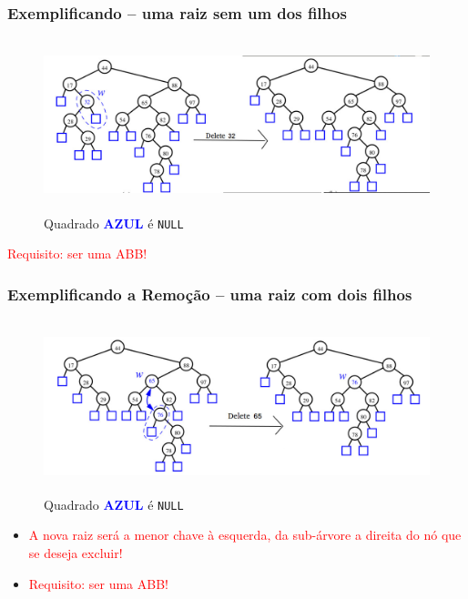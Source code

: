\begin{frame}
\frametitle{Exemplificando -- uma raiz sem um dos filhos}

   \begin{figure}[!ht]
    \centering
    \includegraphics[keepaspectratio=true,width=12cm,height=5cm]{figs/fig_arvores/ex01_Delete_NODE.jpg}
\caption{Quadrado \textbf{\textcolor{blue}{AZUL}} é \texttt{NULL}}
    \end{figure}

\begin{flushleft}
\textcolor{red}{Requisito: ser uma ABB!}
\end{flushleft}
\end{frame}
\begin{frame}
\frametitle{Exemplificando a Remoção -- uma raiz com dois filhos}

   \begin{figure}[!ht]
    \centering
    \includegraphics[keepaspectratio=true,width=12cm,height=5cm]{figs/fig_arvores/ex02_Delete_NODE.jpg}
   \caption{Quadrado \textbf{\textcolor{blue}{AZUL}} é \texttt{NULL}}
    \end{figure}



\begin{flushleft}
\begin{itemize}
  \item \textcolor{red}{A nova raiz será a menor chave à esquerda, da sub-árvore a direita
do nó que se deseja excluir!}


\item \textcolor{red}{Requisito: ser uma ABB!}

\end{itemize}
\end{flushleft}
\end{frame}
